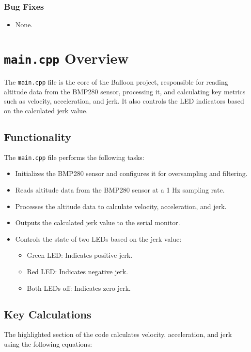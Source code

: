 \documentclass{article}
\begin{document}
\subsubsection{Bug Fixes}
\begin{itemize}
    \item None.
\end{itemize}



\section{\texttt{main.cpp} Overview}
The \texttt{main.cpp} file is the core of the Balloon project, responsible for reading altitude data from the BMP280 sensor, processing it, and calculating key metrics such as velocity, acceleration, and jerk. It also controls the LED indicators based on the calculated jerk value.

\subsection{Functionality}
The \texttt{main.cpp} file performs the following tasks:
\begin{itemize}
    \item Initializes the BMP280 sensor and configures it for oversampling and filtering.
    \item Reads altitude data from the BMP280 sensor at a 1 Hz sampling rate.
    \item Processes the altitude data to calculate velocity, acceleration, and jerk.
    \item Outputs the calculated jerk value to the serial monitor.
    \item Controls the state of two LEDs based on the jerk value:
    \begin{itemize}
        \item Green LED: Indicates positive jerk.
        \item Red LED: Indicates negative jerk.
        \item Both LEDs off: Indicates zero jerk.
    \end{itemize}
\end{itemize}


\subsection{Key Calculations}
The highlighted section of the code calculates velocity, acceleration, and jerk using the following equations:
\end{document}
